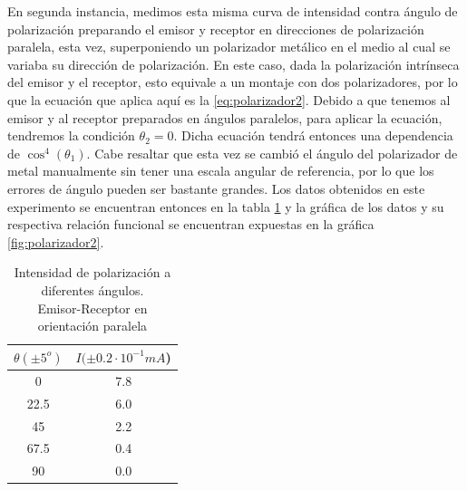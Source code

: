 \documentclass[%
 reprint,
 amsmath,amssymb,
 aps,
]{revtex4-1}
\begin{document}
En segunda instancia, medimos esta misma curva de intensidad contra ángulo de polarización preparando el emisor y receptor en direcciones de polarización paralela, esta vez, superponiendo un polarizador metálico en el medio al cual se variaba su dirección de polarización. En este caso, dada la polarización intrínseca del emisor y el receptor, esto equivale a un montaje con dos polarizadores, por lo que la ecuación que aplica aquí es la \ref{eq:polarizador2}. Debido a que tenemos al emisor y al receptor preparados en ángulos paralelos, para aplicar la ecuación, tendremos la condición $\theta_2 = 0$. Dicha ecuación tendrá entonces una dependencia de $\cos^4{(\theta_1)}$. Cabe resaltar que esta vez se cambió el ángulo del polarizador de metal manualmente sin tener una escala angular de referencia, por lo que los errores de ángulo pueden ser bastante grandes. Los datos obtenidos en este experimento se encuentran entonces en la tabla \ref{table:polarizador2} y la gráfica de los datos y su respectiva relación funcional se encuentran expuestas en la gráfica \ref{fig:polarizador2}. \\

\begin{table}[h!]
\centering
\begin{tabular}{|c|c|}
	\hline $ \theta (\pm 5^o) $ & $ I(\pm 0.2\cdot 10^{-1}mA  $)  \\ 
	\hline\hline
	0  &  7.8\\
	22.5 &  6.0\\ 
	45 &  2.2\\ 
	67.5 &  0.4\\ 
	90 &  0.0\\ 
	[1ex] 
 \hline
 \end{tabular} 
  \caption{Intensidad de polarización a diferentes ángulos.\\ Emisor-Receptor en orientación paralela}
\label{table:polarizador2} 
\end{table}
\end{document}
